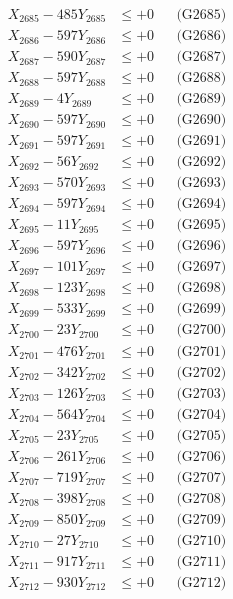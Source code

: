 \documentclass[a4paper,10pt]{article}
\begin{document}
{\begin{align}
X_{2685} - 485Y_{2685} &\leq +0 && \text{(G2685)} \\
X_{2686} - 597Y_{2686} &\leq +0 && \text{(G2686)} \\
X_{2687} - 590Y_{2687} &\leq +0 && \text{(G2687)} \\
X_{2688} - 597Y_{2688} &\leq +0 && \text{(G2688)} \\
X_{2689} - 4Y_{2689} &\leq +0 && \text{(G2689)} \\
X_{2690} - 597Y_{2690} &\leq +0 && \text{(G2690)} \\
\allowbreak
X_{2691} - 597Y_{2691} &\leq +0 && \text{(G2691)} \\
X_{2692} - 56Y_{2692} &\leq +0 && \text{(G2692)} \\
X_{2693} - 570Y_{2693} &\leq +0 && \text{(G2693)} \\
X_{2694} - 597Y_{2694} &\leq +0 && \text{(G2694)} \\
X_{2695} - 11Y_{2695} &\leq +0 && \text{(G2695)} \\
X_{2696} - 597Y_{2696} &\leq +0 && \text{(G2696)} \\
X_{2697} - 101Y_{2697} &\leq +0 && \text{(G2697)} \\
X_{2698} - 123Y_{2698} &\leq +0 && \text{(G2698)} \\
X_{2699} - 533Y_{2699} &\leq +0 && \text{(G2699)} \\
X_{2700} - 23Y_{2700} &\leq +0 && \text{(G2700)} \\
\allowbreak
X_{2701} - 476Y_{2701} &\leq +0 && \text{(G2701)} \\
X_{2702} - 342Y_{2702} &\leq +0 && \text{(G2702)} \\
X_{2703} - 126Y_{2703} &\leq +0 && \text{(G2703)} \\
X_{2704} - 564Y_{2704} &\leq +0 && \text{(G2704)} \\
X_{2705} - 23Y_{2705} &\leq +0 && \text{(G2705)} \\
X_{2706} - 261Y_{2706} &\leq +0 && \text{(G2706)} \\
X_{2707} - 719Y_{2707} &\leq +0 && \text{(G2707)} \\
X_{2708} - 398Y_{2708} &\leq +0 && \text{(G2708)} \\
X_{2709} - 850Y_{2709} &\leq +0 && \text{(G2709)} \\
X_{2710} - 27Y_{2710} &\leq +0 && \text{(G2710)} \\
\allowbreak
X_{2711} - 917Y_{2711} &\leq +0 && \text{(G2711)} \\
X_{2712} - 930Y_{2712} &\leq +0 && \text{(G2712)} \\

\end{align}}
\end{document}
